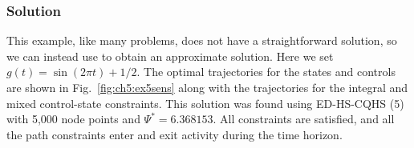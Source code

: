 \subsubsection{Solution}

This example, like many \lqdo{} problems, does not have a straightforward solution, so we can instead use \dt{} to obtain an approximate solution.
Here we set $g(t) = \sin(2 \pi t) +1/2$.
The optimal trajectories for the states and controls are shown in Fig.~\ref{fig:ch5:ex5sens} along with the trajectories for the integral and mixed control-state constraints.
This solution was found using ED-HS-CQHS (5) with 5,000 node points and $\Psi^*=6.368153$.
All constraints are satisfied, and all the path constraints enter and exit activity during the time horizon.


